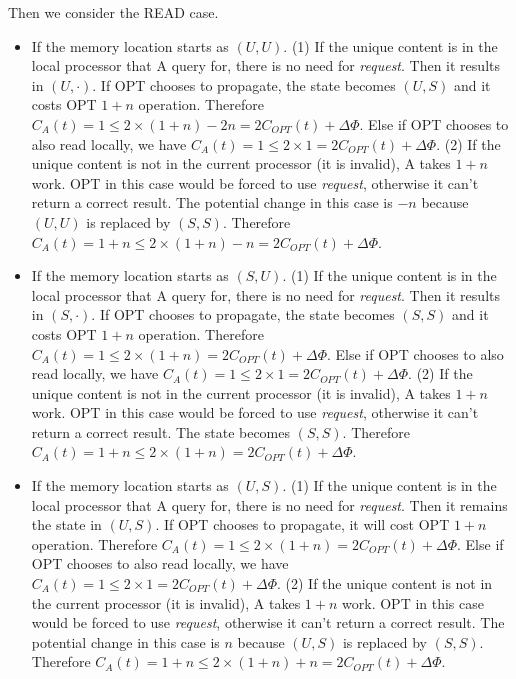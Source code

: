\documentclass[12pt]{article}
\begin{document}
Then we consider the READ case.
\begin{itemize}
	\item If the memory location starts as $(U, U)$. (1) If the unique content is in the local processor that A query for, there is no need for \emph{request}. Then it results in $(U, \cdot)$. If OPT chooses to propagate, the state becomes $(U, S)$ and it costs OPT $1+n$ operation. Therefore $C_A(t) = 1 \leq 2\times (1 + n) - 2n = 2C_{OPT}(t) + \Delta \Phi$. Else if OPT chooses to also read locally, we have $C_A(t) = 1 \leq 2\times 1 = 2C_{OPT}(t) + \Delta \Phi$. (2) If the unique content is not in the current processor (it is invalid), A takes $1+n$ work. OPT in this case would be forced to use \emph{request}, otherwise it can't return a correct result. The potential change in this case is $-n$ because $(U, U)$ is replaced by $(S, S)$. Therefore $C_A(t) = 1 + n \leq 2\times (1 + n) - n = 2C_{OPT}(t) + \Delta \Phi$.
	
	\item If the memory location starts as $(S, U)$. (1) If the unique content is in the local processor that A query for, there is no need for \emph{request}. Then it results in $(S, \cdot)$. If OPT chooses to propagate, the state becomes $(S, S)$ and it costs OPT $1+n$ operation. Therefore $C_A(t) = 1 \leq 2\times (1 + n) = 2C_{OPT}(t) + \Delta \Phi$. Else if OPT chooses to also read locally, we have $C_A(t) = 1 \leq 2\times 1 = 2C_{OPT}(t) + \Delta \Phi$. (2) If the unique content is not in the current processor (it is invalid), A takes $1+n$ work. OPT in this case would be forced to use \emph{request}, otherwise it can't return a correct result. The state becomes $(S, S)$. Therefore $C_A(t) = 1 + n \leq 2\times (1 + n) = 2C_{OPT}(t) + \Delta \Phi$.
	
	\item If the memory location starts as $(U, S)$. (1) If the unique content is in the local processor that A query for, there is no need for \emph{request}. Then it remains the state in $(U, S)$. If OPT chooses to propagate, it will cost OPT $1+n$ operation. Therefore $C_A(t) = 1 \leq 2\times (1 + n) = 2C_{OPT}(t) + \Delta \Phi$. Else if OPT chooses to also read locally, we have $C_A(t) = 1 \leq 2\times 1 = 2C_{OPT}(t) + \Delta \Phi$. (2) If the unique content is not in the current processor (it is invalid), A takes $1+n$ work. OPT in this case would be forced to use \emph{request}, otherwise it can't return a correct result. The potential change in this case is $n$ because $(U, S)$ is replaced by $(S, S)$. Therefore $C_A(t) = 1 + n \leq 2\times (1 + n) + n = 2C_{OPT}(t) + \Delta \Phi$.
	

\end{itemize}
\end{document}
